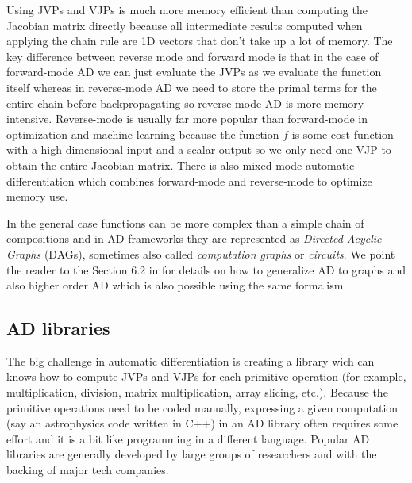 \documentclass[12pt,dvipsnames]{report}
\begin{document}
Using JVPs and VJPs is much more memory efficient than computing the Jacobian matrix directly 
because all intermediate results computed when applying the chain rule are 1D vectors that 
don't take up a lot of memory. The key difference between reverse mode and  forward mode is that 
in the case of forward-mode AD we can just evaluate the JVPs as we evaluate the function itself 
whereas in reverse-mode AD we need to store the primal terms for the entire chain before 
backpropagating so reverse-mode AD is more memory intensive.
Reverse-mode is usually far more popular than forward-mode in optimization and machine learning 
because the function $f$ is some cost function with  a high-dimensional input and a scalar 
output so we only need one VJP to obtain the entire Jacobian matrix. There is also mixed-mode 
automatic differentiation which combines forward-mode and reverse-mode to optimize memory use.

In the general case functions can be more complex than a simple chain of compositions and in AD 
frameworks they are represented as \textsl{Directed Acyclic Graphs} (DAGs), sometimes also 
called \textsl{computation graphs} or \textsl{circuits}. We point the reader to the Section 
6.2 in \citep{murphy_book_2023} for details on how to generalize AD to graphs and also higher 
order AD which is also possible using the same formalism. 

\subsection{AD libraries}
The big challenge in automatic differentiation is creating a library wich can knows how to compute 
JVPs and VJPs for each primitive operation (for example, multiplication, division, 
matrix multiplication, array slicing, etc.).
Because the primitive operations need to be coded 
manually, expressing a given computation (say an astrophysics code written in \textsf{C++}) in 
an AD library often requires some effort and it is a bit like programming in a different 
language. 
Popular AD libraries are generally developed by large groups of researchers and with the backing 
of major tech companies.
\end{document}
